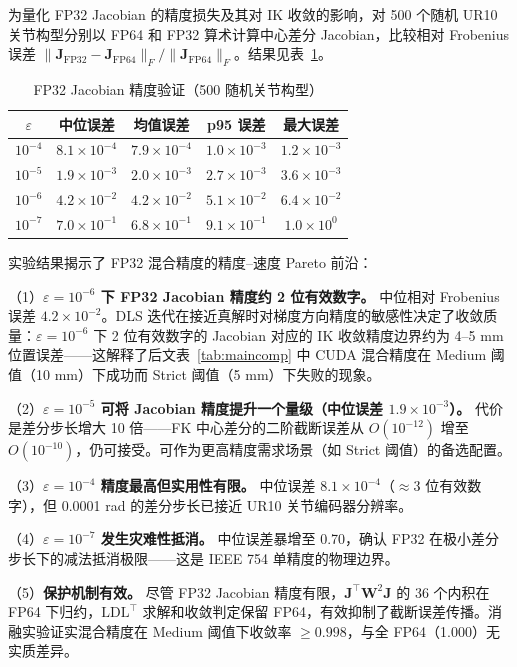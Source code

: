 \documentclass[twocolumn,a4paper,10pt]{ctexart}
\begin{document}
为量化 FP32 Jacobian 的精度损失及其对 IK 收敛的影响，对 500 个随机 UR10 关节构型分别以 FP64 和 FP32 算术计算中心差分 Jacobian，比较相对 Frobenius 误差 $\|\mathbf{J}_{\mathrm{FP32}}-\mathbf{J}_{\mathrm{FP64}}\|_F/\|\mathbf{J}_{\mathrm{FP64}}\|_F$。结果见表~\ref{tab:jacobian}。

\begin{table}[ht]
\centering\small
\caption{FP32 Jacobian 精度验证（500 随机关节构型）}
\label{tab:jacobian}
\begin{tabular}{ccccc}
\toprule
$\varepsilon$ & 中位误差 & 均值误差 & p95 误差 & 最大误差 \\
\midrule
$10^{-4}$ & $8.1\times10^{-4}$ & $7.9\times10^{-4}$ & $1.0\times10^{-3}$ & $1.2\times10^{-3}$ \\
$10^{-5}$ & $1.9\times10^{-3}$ & $2.0\times10^{-3}$ & $2.7\times10^{-3}$ & $3.6\times10^{-3}$ \\
$10^{-6}$ & {\bfseries $4.2\times10^{-2}$} & $4.2\times10^{-2}$ & $5.1\times10^{-2}$ & $6.4\times10^{-2}$ \\
$10^{-7}$ & $7.0\times10^{-1}$ & $6.8\times10^{-1}$ & $9.1\times10^{-1}$ & $1.0\times10^{0}$ \\
\bottomrule
\end{tabular}
\end{table}

实验结果揭示了 FP32 混合精度的精度--速度 Pareto 前沿：

（1）{\bfseries $\varepsilon=10^{-6}$ 下 FP32 Jacobian 精度约 2 位有效数字。} 中位相对 Frobenius 误差 $4.2\times10^{-2}$。DLS 迭代在接近真解时对梯度方向精度的敏感性决定了收敛质量：$\varepsilon=10^{-6}$ 下 2 位有效数字的 Jacobian 对应的 IK 收敛精度边界约为 4--5 mm 位置误差——这解释了后文表~\ref{tab:maincomp} 中 CUDA 混合精度在 Medium 阈值（10 mm）下成功而 Strict 阈值（5 mm）下失败的现象。

（2）{\bfseries $\varepsilon=10^{-5}$ 可将 Jacobian 精度提升一个量级（中位误差 $1.9\times10^{-3}$）。} 代价是差分步长增大 10 倍——FK 中心差分的二阶截断误差从 $O(10^{-12})$ 增至 $O(10^{-10})$，仍可接受。可作为更高精度需求场景（如 Strict 阈值）的备选配置。

（3）{\bfseries $\varepsilon=10^{-4}$ 精度最高但实用性有限。} 中位误差 $8.1\times10^{-4}$（$\approx3$ 位有效数字），但 0.0001 rad 的差分步长已接近 UR10 关节编码器分辨率。

（4）{\bfseries $\varepsilon=10^{-7}$ 发生灾难性抵消。} 中位误差暴增至 0.70，确认 FP32 在极小差分步长下的减法抵消极限——这是 IEEE 754 单精度的物理边界。

（5）{\bfseries 保护机制有效。} 尽管 FP32 Jacobian 精度有限，$\mathbf{J}^\top\mathbf{W}^2\mathbf{J}$ 的 36 个内积在 FP64 下归约，$\mathrm{LDL}^\top$ 求解和收敛判定保留 FP64，有效抑制了截断误差传播。消融实验证实混合精度在 Medium 阈值下收敛率 $\ge0.998$，与全 FP64（1.000）无实质差异。
\end{document}

